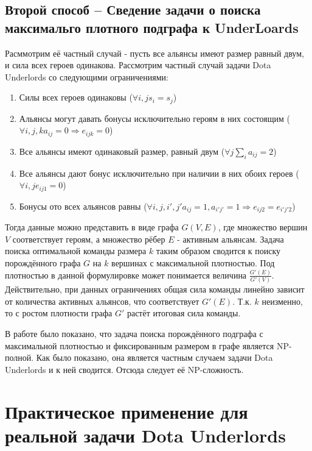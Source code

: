 \documentclass{article}
\begin{document}
\subsection{Второй способ – Сведение задачи о поиска максимальго плотного подграфа к UnderLoards}

Расммотрим её частный случай - пусть все альянсы имеют размер равный двум, и сила всех героев одинакова. Рассмотрим частный случай задачи Dota Underlords со следующими ограничениями:

\begin{enumerate}
    \item Силы всех героев одинаковы ($\forall i, j s_i=s_j$)
    \item Альянсы могут давать бонусы исключительно героям в них состоящим ($\forall i, j, k a_{ij}=0 \Longrightarrow e_{ijk} = 0$)
    \item Все альянсы имеют одинаковый размер, равный двум ($\forall j \sum_i a_{ij}=2$)
    \item Все альянсы дают бонус исключительно при наличии в них обоих героев ($\forall i, j e_{ij1}=0$)
    \item Бонусы ото всех альянсов равны ($\forall i, j, i', j' a_{ij}=1, a_{i' j'}=1 \Longrightarrow e_{ij2}=e_{i' j' 2}$)
\end{enumerate}

Тогда данные можно представить в виде графа $G(V, E)$, где множество вершин $V$ соответствует героям, а множество рёбер $E$ - активным альянсам. Задача поиска оптимальной команды размера $k$ таким образом сводится к поиску порождённого графа $G$ на $k$ вершинах с максимальной плотностью. Под плотностью в данной формулировке может понимается величина $\frac{G'(E)}{G'(V)}$. Действительно, при данных ограничениях общая сила команды линейно зависит от количества активных альянсов, что соответствует $G'(E)$. Т.к. $k$ неизменно, то с ростом плотности графа $G'$ растёт итоговая сила команды.

В работе \cite{downey1995fixed} было показано, что задача поиска порождённого подграфа с максимальной плотностью и фиксированным размером в графе является NP-полной. Как было показано, она является частным случаем задачи Dota Underlords и к ней сводится. Отсюда следует её NP-сложность.


\section{Практическое применение для реальной задачи Dota Underlords}
  
\end{document}

